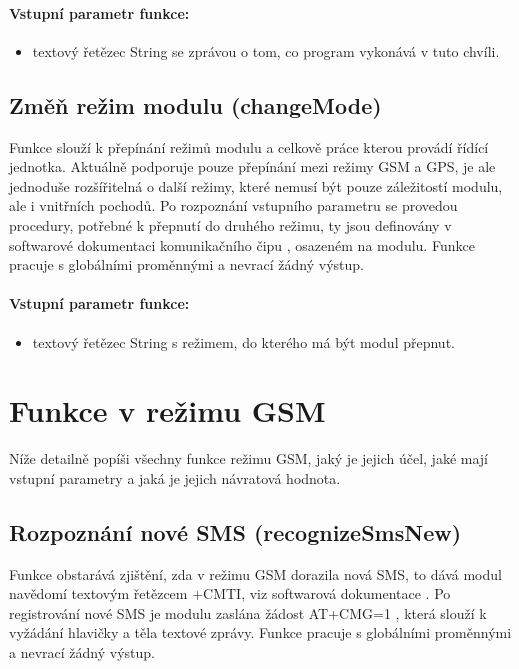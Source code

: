 \documentclass[FM,MP]{tulthesis}  %
\begin{document}
\paragraph{Vstupní parametr funkce:}
\begin{itemize}
\item textový řetězec String se zprávou o tom, co program vykonává v tuto chvíli.
\end{itemize}

\subsection{Změň režim modulu (changeMode)}
Funkce slouží k přepínání režimů modulu a celkově práce kterou provádí řídící jednotka. Aktuálně podporuje pouze přepínání mezi režimy GSM a GPS, je ale jednoduše rozšířitelná o další režimy, které nemusí být pouze záležitostí modulu, ale i vnitřních pochodů. Po rozpoznání vstupního parametru se provedou procedury, potřebné k přepnutí do druhého režimu, ty jsou definovány v softwarové dokumentaci komunikačního čipu \cite{SIMCOM SW}, osazeném na modulu. Funkce pracuje s globálními proměnnými a nevrací žádný výstup.

\paragraph{Vstupní parametr funkce:}
\begin{itemize}
\item textový řetězec String s režimem, do kterého má být modul přepnut.
\end{itemize}


\section{Funkce v režimu GSM}
Níže detailně popíši všechny funkce režimu GSM, jaký je jejich účel, jaké mají vstupní parametry a jaká je jejich návratová hodnota.

\subsection{Rozpoznání nové SMS (recognizeSmsNew)}
Funkce obstarává zjištění, zda v režimu GSM dorazila nová SMS, to dává modul navědomí textovým řetězcem +CMTI, viz softwarová dokumentace \cite{SIMCOM SW}. Po registrování nové SMS je modulu zaslána žádost AT+CMG=1 \cite{SIMCOM SW}, která slouží k vyžádání hlavičky a těla textové zprávy. Funkce pracuje s globálními proměnnými a nevrací žádný výstup.
\end{document}
